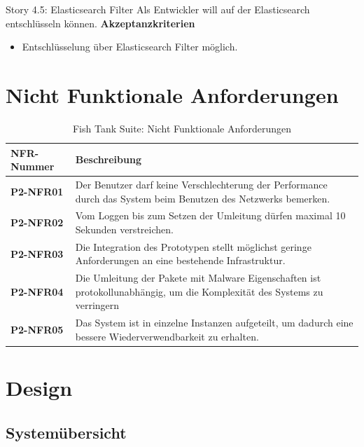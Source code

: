 \begin{story}{Story 4.5:  Elasticsearch Filter}
  Als Entwickler will auf der Elasticsearch entschlüsseln können.
  \tcblower
  \textbf{Akzeptanzkriterien}
  \begin{itemize}
  	\item Entschlüsselung über Elasticsearch Filter möglich.
  \end{itemize}
\end{story}


\begin{table}[H]
	\section{Nicht Funktionale Anforderungen}
    \centering
	\begin{tabularx}{\textwidth}{| l | X |}
                \hline
        \textbf{NFR-Nummer} & \textbf{Beschreibung} \\ \hline
        \textbf{P2-NFR01} & Der Benutzer darf keine Verschlechterung der Performance durch das System beim Benutzen des Netzwerks bemerken. \\\hline        
        \textbf{P2-NFR02} & Vom Loggen bis zum Setzen der Umleitung dürfen maximal 10 Sekunden verstreichen.\\ \hline
        \textbf{P2-NFR03} & Die Integration des Prototypen stellt möglichst geringe Anforderungen an eine bestehende Infrastruktur. \\ \hline
        \textbf{P2-NFR04} & Die Umleitung der Pakete mit Malware Eigenschaften ist protokollunabhängig, um die Komplexität des Systems zu verringern\\ \hline
        \textbf{P2-NFR05} & Das System ist in einzelne Instanzen aufgeteilt, um dadurch eine bessere Wiederverwendbarkeit zu erhalten.\\ \hline
    \end{tabularx}
    \caption{Fish Tank Suite: Nicht Funktionale Anforderungen}
\end{table}    


\section{Design}

\subsection{Systemübersicht}

